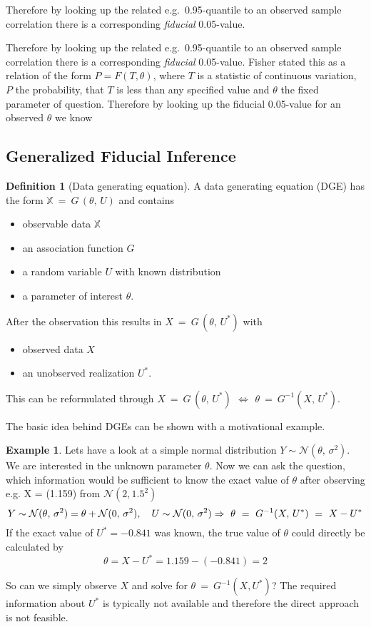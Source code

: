 \documentclass[
]{report}
\theoremstyle{definition}
\newtheorem{definition}{Definition}[section]
\newtheorem{example}{Example}[section]
\begin{document}
Therefore by looking up the related e.g.~0.95-quantile to an observed
sample correlation there is a corresponding \textit{fiducial}
0.05-value.

Therefore by looking up the related e.g.~0.95-quantile to an observed
sample correlation there is a corresponding \textit{fiducial}
0.05-value. Fisher stated this as a relation of the form
\(P = F(T, \theta)\), where \(T\) is a statistic of continuous
variation, \(P\) the probability, that \(T\) is less than any specified
value and \(\theta\) the fixed parameter of question. Therefore by
looking up the fiducial 0.05-value for an observed \(\theta\) we know

\subsection{Generalized Fiducial Inference}

\begin{definition}[Data generating equation]
A data generating equation (DGE) has the form $\mathbb{X} \ = \  G \, (\theta, \, U)$ and contains
\begin{itemize}
  \item observable data $\mathbb{X}$
  \item an association function $G$
  \item a random variable $U$ with known distribution
  \item a parameter of interest $\theta$.
\end{itemize}
After the observation this results in $X \ = \ G \, (\theta, \, U^*)$ with
\begin{itemize}
  \item observed data $X$
  \item an unobserved realization $U^*$.
\end{itemize}
\end{definition}

This can be reformulated through
\(X \ = \ G \, (\theta, \, U^*) \ \, \Leftrightarrow \ \, \theta \ = \ G^{-1}(X, \, U^*)\).

The basic idea behind DGEs can be shown with a motivational example.

\begin{example}
Lets have a look at a simple normal distribution $Y \sim \mathcal{N}(\theta,\, \sigma^2)$. We are interested in the unknown parameter $\theta$. Now we can ask the question, which information would be sufficient to know the exact value of $\theta$ after observing e.g. X = (1.159) from $\mathcal{N}(2, 1.5^2)$
$$Y \sim \mathcal{N}(\theta,\, \sigma^2) = \theta + \mathcal{N}(0,\, \sigma^2), \quad U \sim \mathcal{N}(0,\, \sigma^2) \newline
\Rightarrow \ \theta \ = \ G^{-1}(X, \, U^*) \ = \ X - U^*$$
If the exact value of $U^* = -0.841$ was known, the true value of $\theta$ could directly be calculated by
$$\theta = X- U^* = 1.159 - (-0.841) = 2$$
\end{example}

So can we simply observe \(X\) and solve for
\(\theta \ = \ G^{-1}(X, U^*)\)? The required information about \(U^*\)
is typically not available and therefore the direct approach is not
feasible.


\printbibliography
\end{document}
